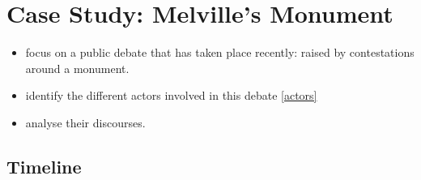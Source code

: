 \documentclass{scrartcl}
\begin{document}
\section{Case Study: Melville's Monument}

\begin{itemize}
    \item focus on a public debate that has taken place recently: raised by contestations around a monument. 
    \item identify the different actors involved in this debate \ref{actors}
    \item analyse their discourses. 
\end{itemize}

\subsection{Timeline}
\end{document}
